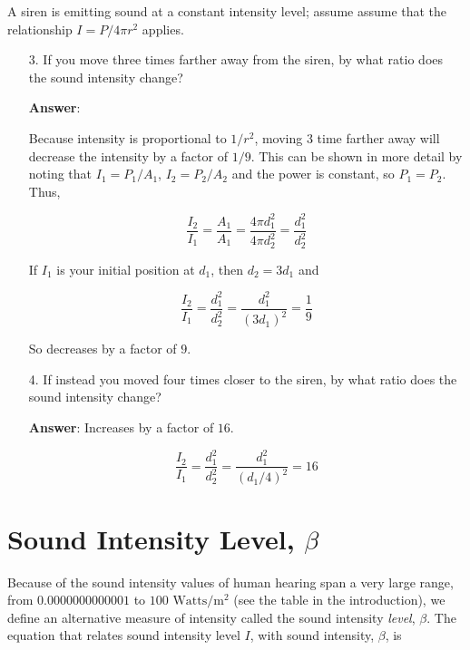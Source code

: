 \documentclass{article}
\begin{document}
\vskip 0.75pt

A siren is emitting sound at a constant intensity level; assume assume that the relationship $I = P/4\pi r^2$ applies.

\begin{enumerate}

  \item[3.] If you move three times farther away from the siren, by what ratio does the sound intensity change?

            \ifsolutions
            \textbf{Answer}:

            Because intensity is proportional to $1/r^2$, moving 3 time farther away will decrease the intensity by a factor of $1/9$. This can be shown in more detail by noting that $I_1 = P_1/A_1$, $I_2=P_2/A_2$ and the power is constant, so $P_1=P_2$. Thus,

            $$\frac{I_2}{I_1} = \frac{A_1}{A_1} = \frac{4\pi d_1^2}{4\pi d_2^2} =  \frac{d_1^2}{d_2^2}$$

            If $I_1$ is your initial position at $d_1$, then $d_2 = 3d_1$ and

            $$\frac{I_2}{I_1} =  \frac{d_1^2}{d_2^2} = \frac{d_1^2}{(3d_1)^2} = \frac{1}{9}$$

            So decreases by a factor of $9$.
            \else
            \vskip 120pt
            \fi

  \item[4.] If instead you moved four times closer to the siren, by what ratio does the sound intensity change?

            \ifsolutions
            \textbf{Answer}: Increases by a factor of $16$.

            $$\frac{I_2}{I_1} = \frac{d_1^2}{d_2^2} =  \frac{d_1^2}{(d_1/4)^2} = 16$$
            \else
            \fi

\end{enumerate}

\newpage

\section{Sound Intensity Level, $\beta$}

Because of the sound intensity values of human hearing span a very large range, from $0.0000000000001$ to $100$ $\text{Watts}/\text{m}^2$ (see the table in the introduction), we define an alternative measure of intensity called the sound intensity \emph{level}, $\beta$. The equation that relates sound intensity level $I$, with sound intensity, $\beta$, is
\end{document}
